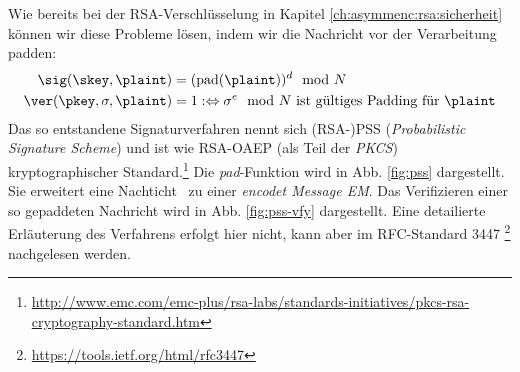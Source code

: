 Wie bereits bei der RSA-Verschlüsselung in Kapitel \ref{ch:asymmenc:rsa:sicherheit} können wir diese Probleme lösen, indem wir die Nachricht vor der Verarbeitung padden:
\begin{align*}
\sig(\skey,\plaint) &= (\text{pad}(\plaint))^d \mod N\\
\ver(\pkey,\sigma,\plaint) &= 1 :\Leftrightarrow \sigma^e \mod N \text{ ist gültiges Padding für } \plaint
\end{align*}
Das so entstandene Signaturverfahren nennt sich (RSA-)PSS
(\emph{Probabilistic Signature Scheme}) und ist wie RSA-OAEP (als Teil
der \emph{PKCS}) kryptographischer
Standard.\footnote{\url{http://www.emc.com/emc-plus/rsa-labs/standards-initiatives/pkcs-rsa-cryptography-standard.htm}} 
Die \textit{pad}-Funktion wird in Abb. \ref{fig:pss} dargestellt. Sie
erweitert eine Nachticht \plaint~zu einer \textit{encodet Message
  EM}. Das Verifizieren einer so gepaddeten Nachricht wird in
Abb. \ref{fig:pss-vfy} dargestellt. Eine detailierte Erläuterung des
Verfahrens erfolgt hier nicht, kann aber im RFC-Standard 3447
\footnote{\url{https://tools.ietf.org/html/rfc3447}} nachgelesen werden.

